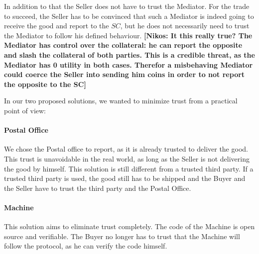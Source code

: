\documentclass{cacthesis}
\newcommand{\authnote}[3]{{ \footnotesize \textbf{#1[#2: #3]~}}}
\newcommand{\niknote}[1]{\authnote{\color{red}}{Nikos}{#1}}
\begin{document}
In addition to that the Seller does not have to trust the Mediator. For the trade to succeed, the Seller has to be convinced that such a Mediator is indeed going to receive the good and report to the $SC$, but he does not necessarily need to trust the Mediator to follow his defined behaviour. \niknote{It this really true? The Mediator has control over the collateral: he can report the opposite and slash the collateral of both parties. This is a credible threat, as the Mediator has 0 utility in both cases. Therefor a misbehaving Mediator could coerce the Seller into sending him coins in order to not report the opposite to the SC}\newline

In our two proposed solutions, we wanted to minimize trust from a practical point of view:
\paragraph{Postal Office}
We chose the Postal office to report, as it is already trusted to deliver the good. 
This trust is unavoidable in the real world, as long as the Seller is not delivering the good by himself. This solution is still different from a trusted third party. If a trusted third party is used, the good still has to be shipped and the Buyer and the Seller have to trust the third party and the Postal Office.

\paragraph{Machine}
This solution aims to eliminate trust completely. The code of the Machine is open source and verifiable. The Buyer no longer has to trust that the Machine will follow the protocol, as he can verify the code himself.
\end{document}
